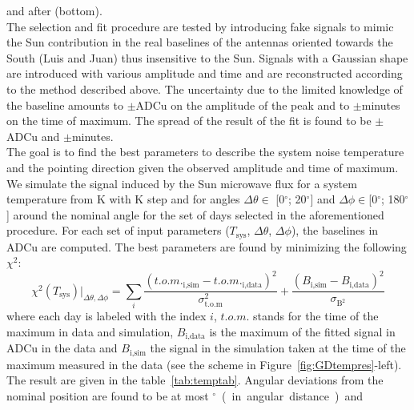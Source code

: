and after (bottom).   \\The selection and fit procedure  are tested by
introducing fake  signals to  mimic the Sun  contribution in  the real
baselines of the  antennas oriented towards the South  (Luis and Juan)
thus  insensitive to  the  Sun.   Signals with  a  Gaussian shape  are
introduced  with  various amplitude  and  time  and are  reconstructed
according to the  method described above.  The uncertainty  due to the
limited knowledge  of the  baseline amounts to  $\pm$\unit[4]{ADCu} on
the amplitude of  the peak and to $\pm$\unit[12]{minutes}  on the time
of  maximum.  The  spread of  the result  of the  fit is  found  to be
$\pm$\unit[5]{ADCu} and $\pm$\unit[6]{minutes}.  \\The goal is to find
the best parameters  to describe the system noise  temperature and the
pointing direction  given the observed amplitude and  time of maximum.
We simulate the signal induced by  the Sun microwave flux for a system
temperature  from \unit[30 to  120]{K} with  \unit[1]{K} step  and for
angles  $\Delta \theta  \in$ [0$^{\circ}$;  20$^{\circ}$]  and $\Delta
\phi \in  $[0$^{\circ}$; 180$^{\circ}$]  around the nominal  angle for
the set  of days selected  in the aforementioned procedure.   For each
set  of  input parameters  ($T_\text{sys}$,  $\Delta \theta$,  $\Delta
\phi$), the baselines  in ADCu are computed.  The  best parameters are
found by minimizing the following $\chi^2$:
\begin{equation}
	\chi^2   (T_\text{sys})  \rvert_{\Delta   \theta,\Delta  \phi}
        =\sum_{i}         \frac{         (t.o.m._\text{i,sim}        -
          t.o.m._\text{i,data})^2}{\sigma_\text{t.o.m}^2}             +
        \frac{(B_\text{i,sim}           -          B_\text{i,data})^2}
        {\sigma_{\text{B}^2}}
	\label{eq:chi2}
\end{equation}
where each day is labeled with  the index $i$, $t.o.m.$ stands for the
time of the maximum in data and simulation, $B_\text{{i,data}}$ is the
maximum   of   the  fitted   signal   in   ADCu   in  the   data   and
$B_\text{{i,sim}}$ the signal  in the simulation taken at  the time of
the   maximum   measured   in    the   data   (see   the   scheme   in
Figure~\ref{fig:GDtempres}-left).   The   result  are  given   in  the
table~\ref{tab:temptab}.  Angular deviations from the nominal position
are found to be at  most \unit[14]{$^\circ$} (in angular distance) and
